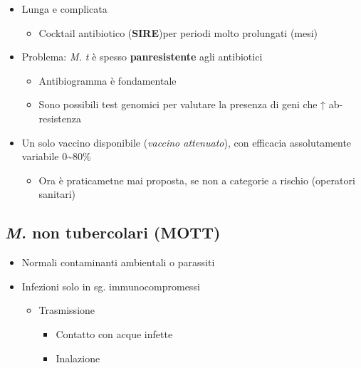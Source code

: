 \documentclass[italian,]{article}
\providecommand{\tightlist}{%
  \setlength{\itemsep}{0pt}\setlength{\parskip}{0pt}}
\begin{document}
\begin{itemize}
\tightlist
\item
  Lunga e complicata

  \begin{itemize}
  \tightlist
  \item
    Cocktail antibiotico (\textbf{SIRE})per periodi molto prolungati
    (mesi)
  \end{itemize}
\item
  Problema: \emph{M. t} è spesso \textbf{panresistente} agli antibiotici

  \begin{itemize}
  \tightlist
  \item
    Antibiogramma è fondamentale
  \item
    Sono possibili test genomici per valutare la presenza di geni che ↑
    ab-resistenza
  \end{itemize}
\item
  Un solo vaccino disponibile (\emph{vaccino attenuato}), con efficacia
  assolutamente variabile 0\textasciitilde{}80\%

  \begin{itemize}
  \tightlist
  \item
    Ora è praticametne mai proposta, se non a categorie a rischio
    (operatori sanitari)
  \end{itemize}
\end{itemize}

\hypertarget{m.-non-tubercolari-mott}{%
\subsection{\texorpdfstring{\emph{M.} non tubercolari
(MOTT)}{M. non tubercolari (MOTT)}}\label{m.-non-tubercolari-mott}}

\begin{itemize}
\tightlist
\item
  Normali contaminanti ambientali o parassiti
\item
  Infezioni solo in sg. immunocompromessi

  \begin{itemize}
  \tightlist
  \item
    Trasmissione

    \begin{itemize}
    \tightlist
    \item
      Contatto con acque infette
    \item
      Inalazione
    \end{itemize}
  \end{itemize}
\end{itemize}
\end{document}

